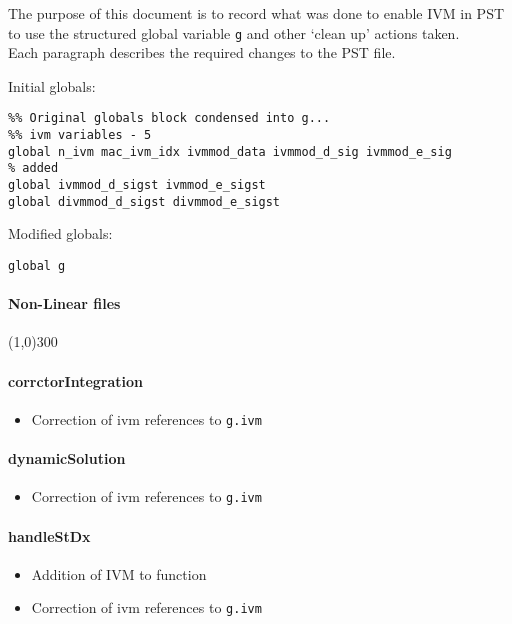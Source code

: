 \documentclass[12pt]{article}
\begin{document}
The purpose of this document is to record what was done to enable IVM in PST to use the structured global variable \verb|g| and other `clean up' actions taken. \\
Each paragraph describes the required changes to the PST file.

Initial globals:
\begin{verbatim}
%% Original globals block condensed into g...
%% ivm variables - 5
global n_ivm mac_ivm_idx ivmmod_data ivmmod_d_sig ivmmod_e_sig
% added
global ivmmod_d_sigst ivmmod_e_sigst
global divmmod_d_sigst divmmod_e_sigst
\end{verbatim}

%

Modified globals:
\begin{verbatim}
global g
\end{verbatim}
\paragraph{Non-Linear files}\line(1,0){300}
\paragraph{corrctorIntegration}
	\begin{itemize}
		\item Correction of ivm references to \verb|g.ivm|
	\end{itemize}
\paragraph{dynamicSolution}
	\begin{itemize}
		\item Correction of ivm references to \verb|g.ivm|
	\end{itemize}
\paragraph{handleStDx}
	\begin{itemize}
		\item Addition of IVM to function
		\item Correction of ivm references to \verb|g.ivm|
	\end{itemize}
\end{document}
